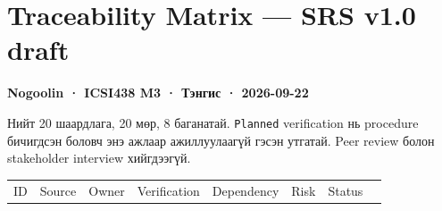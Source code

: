 \documentclass[
  mongolian,
]{article}
\begin{document}
\newpage

\section{Traceability Matrix --- SRS v1.0
draft}\label{traceability-matrix-srs-v1.0-draft}

\textbf{Nogoolin · ICSI438 M3 · Тэнгис · 2026-09-22}

Нийт 20 шаардлага, 20 мөр, 8 баганатай. \texttt{Planned} verification нь
procedure бичигдсэн боловч энэ ажлаар ажиллуулаагүй гэсэн утгатай. Peer
review болон stakeholder interview хийгдээгүй.

\begingroup\footnotesize\setlength{\tabcolsep}{2pt}

\begin{longtable}[]{@{}
  >{\raggedright\arraybackslash}p{}
  >{\raggedright\arraybackslash}p{}
  >{\raggedright\arraybackslash}p{}
  >{\raggedright\arraybackslash}p{}
  >{\raggedright\arraybackslash}p{}
  >{\raggedright\arraybackslash}p{}
  >{\raggedright\arraybackslash}p{}
  >{\raggedright\arraybackslash}p{}@{}}
\toprule\noalign{}
\begin{minipage}[b]{\linewidth}\raggedright
ID
\end{minipage} & \begin{minipage}[b]{\linewidth}\raggedright
Source
\end{minipage} & \begin{minipage}[b]{\linewidth}\raggedright
Owner
\end{minipage} & \begin{minipage}[b]{\linewidth}\raggedright
Verification
\end{minipage} & \begin{minipage}[b]{\linewidth}\raggedright
Dependency
\end{minipage} & \begin{minipage}[b]{\linewidth}\raggedright
Risk
\end{minipage} & \begin{minipage}[b]{\linewidth}\raggedright
Status
\end{minipage} & \begin{minipage}[b]{\linewidth}\raggedright

\end{minipage}
\end{longtable}
\end{document}
